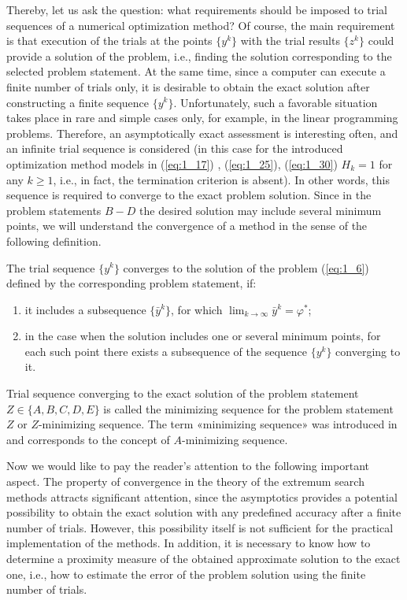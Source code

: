 Thereby, let us ask the question: what requirements should be imposed to trial sequences of a numerical optimization method? Of course, the main requirement is that execution of the trials at the points $\{y^k\}$  with the trial results $\{z^k\}$  could provide a solution of the problem, i.e., finding the solution corresponding to the selected problem statement. At the same time, since a computer can execute a finite number of trials only, it is desirable to obtain the exact solution after constructing a finite sequence $\{y^k\}$. Unfortunately, such a favorable situation takes place in rare and simple cases only, for example, in the linear programming problems. Therefore,  an asymptotically exact assessment is interesting often, and an infinite trial sequence is considered (in this case for the introduced  optimization method models in (\ref{eq:1_17}) , (\ref{eq:1_25}), (\ref{eq:1_30}) $H_k=1$  for any $k\geq1$, i.e., in fact, the termination criterion is absent). In other words, this sequence is required to converge to the exact problem solution. Since in the problem statements $B-D$ the desired solution may include several minimum points, we will understand the convergence of a method in the sense of the following definition.
\begin{definition} 
\label{def:1_4}
The trial sequence $\{y^k\}$  converges to the solution of the problem (\ref{eq:1_6}) defined by the corresponding problem statement, if:
\begin{enumerate}
\item{it includes a subsequence  $\{\bar{y}^k\}$, for which $\lim_{k \to \infty}\bar{y}^k=\varphi^*$;}
\item{in the case when the solution includes one or several minimum points, for each such point there exists a subsequence of the sequence $\{y^k\}$  converging to it.}
\end{enumerate}
\end{definition}
Trial sequence converging to the exact solution of the problem statement $Z \in \{A,B,C,D,E\}$ is called the minimizing sequence for the problem statement $Z$ or $Z$-minimizing sequence. The term «minimizing sequence» was introduced in \cite{1_Vasiliev} and corresponds to the concept of $A$-minimizing sequence.

Now we would like to pay the reader’s attention to the following important aspect. The property of convergence in the theory of the extremum search methods attracts significant attention, since the asymptotics provides a potential possibility to obtain the exact solution with any predefined accuracy after a finite number of trials. However, this possibility itself is not sufficient for the practical implementation of the methods. In addition, it is necessary to know how to determine a proximity measure of the obtained approximate solution to the exact one, i.e., how to estimate the error of the problem solution using the finite number of trials.

